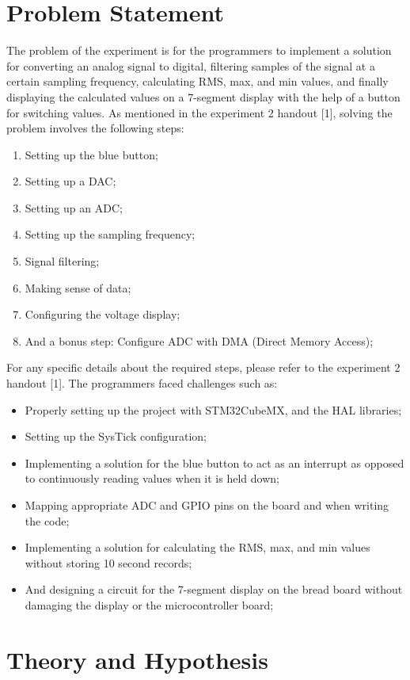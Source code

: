 \documentclass[12pt]{report}
\begin{document}
\section{Problem Statement}
The problem of the experiment is for the programmers to implement a solution for converting an analog signal to digital, filtering samples of the signal at a certain sampling frequency, calculating RMS, max, and min values, and finally displaying the calculated values on a 7-segment display with the help of a button for switching values. 
As mentioned in the experiment 2 handout [1], solving the problem involves the following steps:
\begin{enumerate}
  \item Setting up the blue button;
  \item Setting up a DAC;
  \item Setting up an ADC;
  \item Setting up the sampling frequency;
  \item Signal filtering;
  \item Making sense of data;
  \item Configuring the voltage display;
  \item And a bonus step: Configure ADC with DMA (Direct Memory Access);
\end{enumerate}
For any specific details about the required steps, please refer to the experiment 2 handout [1].
The programmers faced challenges such as: 
\begin{itemize}
  \item Properly setting up the project with STM32CubeMX, and the HAL libraries;
  \item Setting up the SysTick configuration;
  \item Implementing a solution for the blue button to act as an interrupt as opposed to continuously reading values when it is held down; 
  \item Mapping appropriate ADC and GPIO pins on the board and when writing the code;
  \item Implementing a solution for calculating the RMS, max, and min values without storing 10 second records;
  \item And designing a circuit for the 7-segment display on the bread board without damaging the display or the microcontroller board;
\end{itemize}
\section{Theory and Hypothesis}
\end{document}
